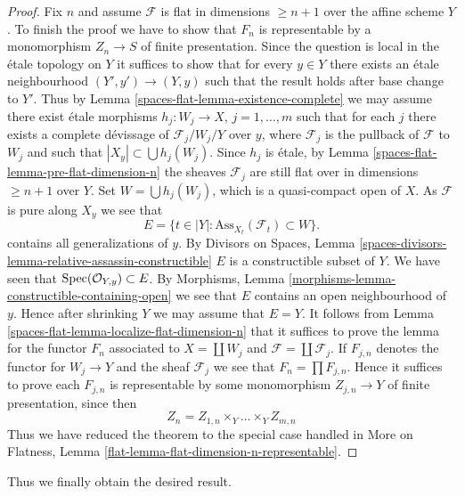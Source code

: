 \begin{proof}
\medskip\noindent
Fix $n$ and assume $\mathcal{F}$ is flat in dimensions $\geq n + 1$
over the affine scheme $Y$.
To finish the proof we have to show that $F_n$ is representable
by a monomorphism $Z_n \to S$ of finite presentation.
Since the question is local in the \'etale topology on $Y$ it suffices to
show that for every $y \in Y$ there exists an \'etale neighbourhood
$(Y', y') \to (Y, y)$ such that the result holds after base change to $Y'$.
Thus by
Lemma \ref{spaces-flat-lemma-existence-complete}
we may assume there exist \'etale morphisms $h_j : W_j \to X$,
$j = 1, \ldots, m$ such that for each $j$ there exists a complete
d\'evissage of $\mathcal{F}_j/W_j/Y$ over $y$,
where $\mathcal{F}_j$ is the pullback of $\mathcal{F}$ to $W_j$
and such that $|X_y| \subset \bigcup h_j(W_j)$. Since
$h_j$ is \'etale, by
Lemma \ref{spaces-flat-lemma-pre-flat-dimension-n}
the sheaves $\mathcal{F}_j$ are still flat over in
dimensions $\geq n + 1$ over $Y$.
Set $W = \bigcup h_j(W_j)$, which is a quasi-compact open of $X$.
As $\mathcal{F}$ is pure along $X_y$ we see that
$$
E = \{t \in |Y| : \text{Ass}_{X_t}(\mathcal{F}_t) \subset W \}.
$$
contains all generalizations of $y$. By
Divisors on Spaces,
Lemma \ref{spaces-divisors-lemma-relative-assassin-constructible}
$E$ is a constructible subset of $Y$. We have seen that
$\operatorname{Spec}(\mathcal{O}_{Y, y}) \subset E$. By
Morphisms, Lemma \ref{morphisms-lemma-constructible-containing-open}
we see that $E$ contains an open neighbourhood of $y$.
Hence after shrinking $Y$ we may assume that $E = Y$.
It follows from
Lemma \ref{spaces-flat-lemma-localize-flat-dimension-n}
that it suffices to prove the lemma for the functor $F_n$ associated to
$X = \coprod W_j$ and $\mathcal{F} = \coprod \mathcal{F}_j$.
If $F_{j, n}$ denotes the functor for $W_j \to Y$ and the sheaf
$\mathcal{F}_j$ we see that $F_n = \prod F_{j, n}$. Hence it suffices
to prove each $F_{j, n}$ is representable by some monomorphism
$Z_{j, n} \to Y$ of finite presentation, since then
$$
Z_n = Z_{1, n} \times_Y \ldots \times_Y Z_{m, n}
$$
Thus we have reduced the theorem to the special case handled in
More on Flatness, Lemma \ref{flat-lemma-flat-dimension-n-representable}.
\end{proof}

Thus we finally obtain the desired result.

